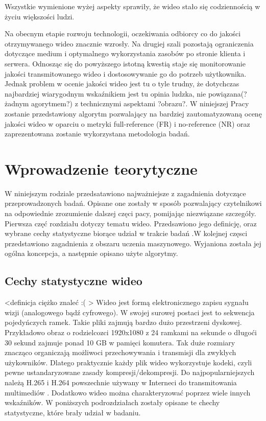 Wszystkie wymienione wyżej aspekty sprawiły, że wideo stało się codziennością w życiu większości ludzi.\par

Na obecnym etapie rozwoju technologii, oczekiwania odbiorcy co do jakości otrzymywanego wideo znacznie wzrosły. Na drugiej szali pozostają ograniczenia dotyczące medium i optymalnego wykorzystania zasobów po stronie klienta i serwera. Odnosząc się do powyższego istotną kwestią staje się monitorowanie jakości transmitowanego wideo i dostosowywanie go do potrzeb użytkownika. Jednak problem w ocenie jakości wideo jest tu o tyle trudny, że dotychczas najbardziej wiarygodnym wskaźnikiem jest tu opinia ludzka, nie powiązana(?żadnym agorytmem?) z technicznymi aspektami ?obrazu?. W niniejszej Pracy zostanie przedstawiony algorytm pozwalający na bardziej zautomatyzowaną ocenę jakości wideo w oparciu o metryki full-reference (FR) i no-reference (NR) oraz zaprezentowana zostanie wykorzystana metodologia badań.



\chapter{Wprowadzenie teorytyczne}
\label{cha:pierwszyDokument}

W niniejszym rodziale przedsatawiono najważniejsze z zagadnienia dotyczące przeprowadzonych badań. Opisane one zostały w sposób pozwalający czytelnikowi na odpowiednie zrozumienie dalszej częci pacy, pomijając niezwiązane szczegóły. Pierwsza częć rozdziału dotyczy tematu wideo. Przedsawiono jego definicję, oraz wybrane cechy statystyczne  biorące udział w trakcie badań .W kolejnej częsci przedstawiono zagadnienia z obszaru uczenia maszynowego. Wyjaniona została jej ogólna koncepcja, a następnie opisano użyte algorytmy.


\section{Cechy statystyczne wideo}

<definicja ciężko znaleć :( >
Wideo jest formą elektronicznego zapisu sygnału wizji (analogowego bądź cyfrowego). W swojej surowej postaci jest to sekwencja pojedyńczych ramek. Takie pliki  zajmują bardzo dużo przestrzeni dyskowej. Przykładowo obraz o rodzielcozci 1920x1080 z 24 ramkami na sekunde o długoći 30 sekund zajmuje ponad 10 GB w pamięci komutera. Tak duże rozmiary znacząco organiczają możliwoci przechowywania i transmisji dla zwyklych użykowników. Dlatego praktycznie każdy plik wideo wykorzystuje kodeki, czyli pewne ustandaryzowane zasady kompresji/dekompresji. Do najpopularniejszych należą H.265 i  H.264 powszechnie używany w Interneci do transmitowania multimediów \cite{video_codecs}. Dodatkowo wideo można charakteryzować poprzez wiele innych wskaźników. W poniższych podrozdziałach zostały opisane te chechy statystyczne,  które brały udział w  badaniu.

